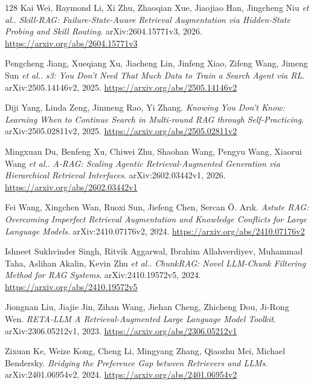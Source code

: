 \documentclass[11pt,a4paper]{article}
\begin{document}
\begin{thebibliography}{128}
Kai Wei, Raymond Li, Xi Zhu, Zhaoqian Xue, Jiaojiao Han, Jingcheng Niu \emph{et al.}.
\newblock \emph{Skill-RAG: Failure-State-Aware Retrieval Augmentation via Hidden-State Probing and Skill Routing}.
\newblock arXiv:2604.15771v3, 2026.
\newblock \url{https://arxiv.org/abs/2604.15771v3}

Pengcheng Jiang, Xueqiang Xu, Jiacheng Lin, Jinfeng Xiao, Zifeng Wang, Jimeng Sun \emph{et al.}.
\newblock \emph{s3: You Don't Need That Much Data to Train a Search Agent via RL}.
\newblock arXiv:2505.14146v2, 2025.
\newblock \url{https://arxiv.org/abs/2505.14146v2}

Diji Yang, Linda Zeng, Jinmeng Rao, Yi Zhang.
\newblock \emph{Knowing You Don't Know: Learning When to Continue Search in Multi-round RAG through Self-Practicing}.
\newblock arXiv:2505.02811v2, 2025.
\newblock \url{https://arxiv.org/abs/2505.02811v2}

Mingxuan Du, Benfeng Xu, Chiwei Zhu, Shaohan Wang, Pengyu Wang, Xiaorui Wang \emph{et al.}.
\newblock \emph{A-RAG: Scaling Agentic Retrieval-Augmented Generation via Hierarchical Retrieval Interfaces}.
\newblock arXiv:2602.03442v1, 2026.
\newblock \url{https://arxiv.org/abs/2602.03442v1}

Fei Wang, Xingchen Wan, Ruoxi Sun, Jiefeng Chen, Sercan \"{O}. Ar\i{}k.
\newblock \emph{Astute RAG: Overcoming Imperfect Retrieval Augmentation and Knowledge Conflicts for Large Language Models}.
\newblock arXiv:2410.07176v2, 2024.
\newblock \url{https://arxiv.org/abs/2410.07176v2}

Ishneet Sukhvinder Singh, Ritvik Aggarwal, Ibrahim Allahverdiyev, Muhammad Taha, Aslihan Akalin, Kevin Zhu \emph{et al.}.
\newblock \emph{ChunkRAG: Novel LLM-Chunk Filtering Method for RAG Systems}.
\newblock arXiv:2410.19572v5, 2024.
\newblock \url{https://arxiv.org/abs/2410.19572v5}

Jiongnan Liu, Jiajie Jin, Zihan Wang, Jiehan Cheng, Zhicheng Dou, Ji-Rong Wen.
\newblock \emph{RETA-LLM A Retrieval-Augmented Large Language Model Toolkit}.
\newblock arXiv:2306.05212v1, 2023.
\newblock \url{https://arxiv.org/abs/2306.05212v1}

Zixuan Ke, Weize Kong, Cheng Li, Mingyang Zhang, Qiaozhu Mei, Michael Bendersky.
\newblock \emph{Bridging the Preference Gap between Retrievers and LLMs}.
\newblock arXiv:2401.06954v2, 2024.
\newblock \url{https://arxiv.org/abs/2401.06954v2}


\end{thebibliography}
\end{document}
